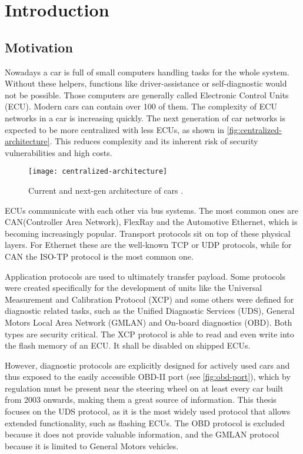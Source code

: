 \chapter{Introduction}
\label{sec:introduction}

\section{Motivation}
Nowadays a car is full of small computers handling tasks for the whole system. Without these helpers, functions like driver-assistance or self-diagnostic would not be possible. Those computers are generally called Electronic Control Units (ECU). Modern cars can contain over 100 of them. The complexity of ECU networks in a car is increasing quickly. The next generation of car networks is expected to be more centralized with less ECUs, as shown in \autoref{fig:centralized-architecture}. This reduces complexity and its inherent risk of security vulnerabilities and high costs.

\begin{figure}[htb]
    \centering
    \texttt{[image: centralized-architecture]}
    \caption{Current and next-gen architecture of cars \cite{car-architecture}.}
    \label{fig:centralized-architecture}
\end{figure}

ECUs communicate with each other via bus systems. The most common ones are CAN(Controller Area Network), FlexRay and the Automotive Ethernet, which is becoming increasingly popular. Transport protocols sit on top of these physical layers. For Ethernet these are the well-known TCP or UDP protocols, while for CAN the ISO-TP protocol is the most common one.

Application protocols are used to ultimately transfer payload. Some protocols were created specifically for the development of units like the Universal Measurement and Calibration Protocol (XCP) and some others were defined for diagnostic related tasks, such as the Unified Diagnostic Services (UDS), General Motors Local Area Network (GMLAN) and On-board diagnostics (OBD). Both types are security critical. 
The XCP protocol is able to read and even write into the flash memory of an ECU. It shall be disabled on shipped ECUs.

However, diagnostic protocols are explicitly designed for actively used cars and thus exposed to the easily accessible OBD-II port (see \autoref{fig:obd-port}), which by regulation must be present near the steering wheel on at least every car built from 2003 onwards, making them a great source of information.
This thesis focuses on the UDS protocol, as it is the most widely used protocol that allows extended functionality, such as flashing ECUs. The OBD protocol is excluded because it does not provide valuable information, and the GMLAN protocol because it is limited to General Motors vehicles.

